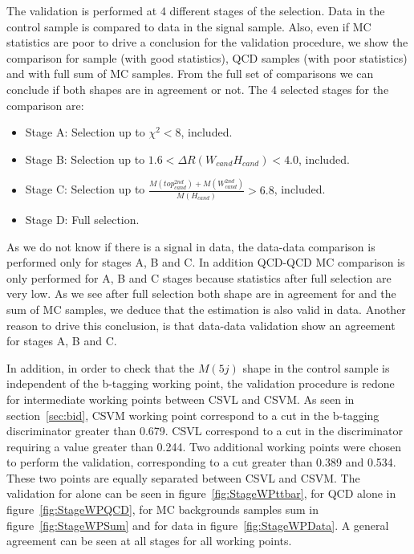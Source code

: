 The validation is performed at 4 different stages of the selection. Data in the control sample is compared to data in the signal sample. Also, even if MC statistics are poor to drive a conclusion for the validation procedure, we show the comparison for \ttbar sample (with good statistics), QCD samples (with poor statistics) and with full sum of MC samples. From the full set of comparisons we can conclude if both shapes are in agreement or not. The 4 selected stages for the comparison are:
\begin{itemize}
\item Stage A: Selection up to $\chi^{2}<8$, included.
\item Stage B: Selection up to $1.6<\Delta R (W_{cand} H_{cand})<4.0$, included.
\item Stage C: Selection up to $\frac{M(top^{2nd}_{cand})+M(W^{2nd}_{cand})}{M(H_{cand})}>6.8$, included.
\item Stage D: Full selection.
\end{itemize}

As we do not know if there is a signal in data, the data-data comparison is performed only for stages A, B and C. In addition QCD-QCD MC comparison is only performed for A, B and C stages because statistics after full selection are very low. As we see after full selection both shape are in agreement for \ttbar and the sum of MC samples, we deduce that the estimation is also valid in data. Another reason to drive this conclusion, is that data-data validation show an agreement for stages A, B and C.

In addition, in order to check that the $M(5j)$ shape in the control sample is independent of the b-tagging working point, the validation procedure is redone for intermediate working points between CSVL and CSVM. As seen in section~\ref{sec:bid}, CSVM working point correspond to a cut in the b-tagging discriminator greater than 0.679. CSVL correspond to a cut in the discriminator requiring a value greater than 0.244. Two additional working points were chosen to perform the validation, corresponding to a cut greater than 0.389 and 0.534. These two points are equally separated between CSVL and CSVM. The validation for \ttbar alone can be seen in figure~\ref{fig:StageWPttbar}, for QCD alone in figure~\ref{fig:StageWPQCD}, for MC backgrounds samples sum in figure~\ref{fig:StageWPSum} and for data in figure~\ref{fig:StageWPData}. A general agreement can be seen at all stages for all working points.

